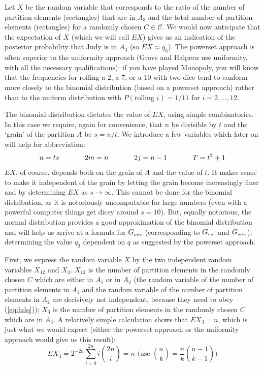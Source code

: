 \documentclass[12pt]{article}
\newcommand{\qnull}[1]{`#1'}
\begin{document}
Let $X$ be the random variable that corresponds to the ratio of the
number of partition elements (rectangles) that are in $A_{3}$ and the
total number of partition elements (rectangles) for a randomly chosen
$C\in\mathcal{C}$. We would now anticipate that the expectation of $X$
(which we will call $EX$) gives us an indication of the posterior
probability that Judy is in $A_{3}$ (so $EX\approx{}q_{3}$). The powerset
approach is often superior to the uniformity approach (Grove and
Halpern use uniformity, with all the necessary qualifications): if you
have played Monopoly, you will know that the frequencies for rolling a
2, a 7, or a 10 with two dice tend to conform more closely to the
binomial distribution (based on a powerset approach) rather than to
the uniform distribution with $P(\mbox{rolling }i)=1/11$ for
$i=2,{\ldots},12$.

The binomial distribution dictates the value of $EX$, using simple
combinatorics. In this case we require, again for convenience, that
$n$ be divisible by $t$ and the \qnull{grain} of the partition $A$ be
$s=n/t$. We introduce a few variables which later on will help for
abbreviation:
\begin{displaymath}
n=ts\hspace{.5in}
2m=n\hspace{.5in}
2j=n-1\hspace{.5in}
{T}=t^{2}+1
\end{displaymath}
$EX$, of course, depends both on the grain of $A$ and the value of
$t$. It makes sense to make it independent of the grain by letting the
grain become increasingly finer and by determining $EX$ as
$s\rightarrow\infty$. This cannot be done for the binomial
distribution, as it is notoriously uncomputable for large numbers
(even with a powerful computer things get dicey around $s=10$). But,
equally notorious, the normal distribution provides a good
approximation of the binomial distribution and will help us arrive at
a formula for $G_{\mbox{\tiny pws}}$ (corresponding to 
$G_{\mbox{\tiny ind}}$ and $G_{\mbox{\tiny max}}$), determining the value $q_{3}$
dependent on $q$ as suggested by the powerset approach.

First, we express the random variable $X$ by the two independent
random variables $X_{12}$ and $X_{3}$. $X_{12}$ is the number of
partition elements in the randomly chosen $C$ which are either in
$A_{1}$ or in $A_{2}$ (the random variable of the number of partition
elements in $A_{1}$ and the random variable of the number of partition
elements in $A_{2}$ are decisively not independent, because they need
to obey ({\ref{eq:hdq}})); $X_{3}$ is the number of partition elements
in the randomly chosen $C$ which are in $A_{3}$. A relatively simple
calculation shows that $EX_{3}=n$, which is just what we would expect
(either the powerset approach or the uniformity approach would give us
this result):
\begin{displaymath}
  EX_{3}=2^{-2n}\sum_{i=0}^{2n}i\binom{2n}{i}=n\mbox{ (use }\binom{n}{k}=\frac{n}{k}\binom{n-1}{k-1}\mbox{)}
\end{displaymath}
\end{document}
